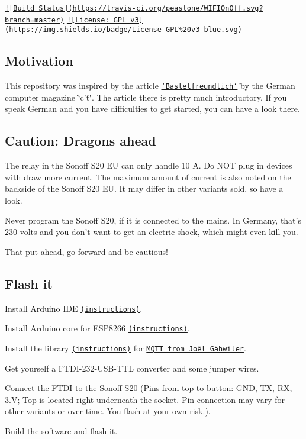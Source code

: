 \href{https://travis-ci.org/peastone/WIFIOnOff}{\tt !\mbox{[}Build Status\mbox{]}(https\-://travis-\/ci.\-org/peastone/\-W\-I\-F\-I\-On\-Off.\-svg?branch=master)} \href{https://www.gnu.org/licenses/gpl-3.0}{\tt !\mbox{[}License\-: G\-P\-L v3\mbox{]}(https\-://img.\-shields.\-io/badge/\-License-\/\-G\-P\-L\%20v3-\/blue.\-svg)}

\subsection*{Motivation}

This repository was inspired by the article \href{https://www.heise.de/ct/ausgabe/2018-2-Steckdose-mit-eingebautem-ESP8266-mit-eigener-Firmware-betreiben-3929796.html}{\tt \char`\"{}\-Bastelfreundlich\char`\"{}} by the German computer magazine \char`\"{}c't\char`\"{}. The article there is pretty much introductory. If you speak German and you have difficulties to get started, you can have a look there.

\subsection*{Caution\-: Dragons ahead}

The relay in the Sonoff S20 E\-U can only handle 10 A. Do N\-O\-T plug in devices with draw more current. The maximum amount of current is also noted on the backside of the Sonoff S20 E\-U. It may differ in other variants sold, so have a look.

Never program the Sonoff S20, if it is connected to the mains. In Germany, that's 230 volts and you don't want to get an electric shock, which might even kill you.

That put ahead, go forward and be cautious!

\subsection*{Flash it}


\begin{DoxyEnumerate}
\item Install Arduino I\-D\-E \href{https://www.arduino.cc/en/Guide/HomePage}{\tt (instructions)}.
\item Install Arduino core for E\-S\-P8266 \href{https://github.com/esp8266/Arduino#installing-with-boards-manager}{\tt (instructions)}.
\item Install the library \href{https://www.arduino.cc/en/Guide/Libraries#toc2}{\tt (instructions)} for \href{https://github.com/256dpi/arduino-mqtt/}{\tt M\-Q\-T\-T from Joël Gähwiler}.
\item Get yourself a F\-T\-D\-I-\/232-\/\-U\-S\-B-\/\-T\-T\-L converter and some jumper wires.
\item Connect the F\-T\-D\-I to the Sonoff S20 (Pins from top to button\-: G\-N\-D, T\-X, R\-X, 3.\-V; Top is located right underneath the socket. Pin connection may vary for other variants or over time. You flash at your own risk.).
\item Build the software and flash it.
\end{DoxyEnumerate}

